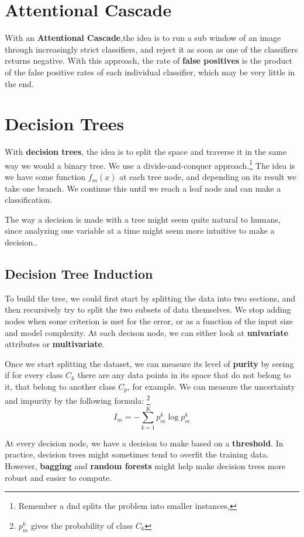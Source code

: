 \documentclass{tufte-handout}
\begin{document}
\section{Attentional Cascade}
With an \textbf{Attentional Cascade},the idea is to run a sub window of an image through increasingly strict
classifiers, and reject it as soon as one of the classifiers returns negative. With this approach, the rate
of \textbf{false positives} is the product of the false positive rates of each individual classifier, which may
be very little in the end.
\section{Decision Trees}
With \textbf{decision trees}, the idea is to split the space and traverse it in the same way we would a binary tree.
We use a divide-and-conquer approach.\footnote{Remember a dnd splits the problem into smaller instances, }
The idea is we have some function $f_{m}(x)$ at each tree node, and depending on its result we take one branch. 
We continue this until we reach a leaf node and can make a classification.

The way a decision is made with a tree might seem quite natural to humans, since analyzing one 
variable at a time might seem more intuitive to make a decision..
\subsection{Decision Tree Induction}
To build the tree, we could first start by splitting the data into two sections, and then recursively try to 
split the two subsets of data themselves. We stop adding nodes when some criterion is met for the error, or 
as a function of the input size and  model complexity. At each decison node, we can either look at
\textbf{univariate} attributes or \textbf{multivariate}.

Once we start splitting the dataset, we can measure its level of \textbf{purity} by seeing if for every class
$C_{k}$ there are any data points in its space that do not belong to it, that belong to another class $C_{p}$,
for example. We can measure the uncertainty and impurity by the following formula: \footnote{$p_{m}^{k}$ gives
the probability of class $C_{k}$}
\[ I_{m} = - \sum_{k = 1}^{K} p_{m}^{k} \log p_{m}^{k}\]

At every decision node, we have a decision to make based on a \textbf{threshold}. In practice, decision trees
might sometimes tend to overfit the training data. However, \textbf{bagging} and \textbf{random forests}
might help make decision trees more robust and easier to compute.
\end{document}
